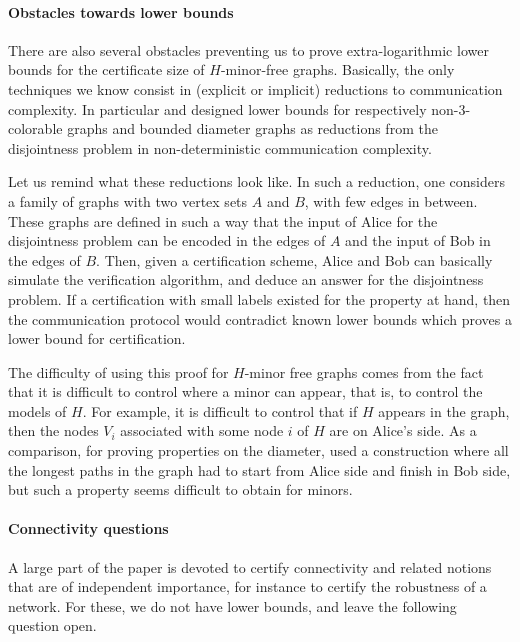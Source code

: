 \documentclass[a4paper,thm-restate,USenglish]{lipics-v2019}
\begin{document}
\paragraph*{Obstacles towards lower bounds}

There are also several obstacles preventing us to prove extra-logarithmic lower bounds for the certificate size of $H$-minor-free graphs. 
Basically, the only techniques we know consist in (explicit or implicit) reductions to communication complexity. 
In particular \cite{GoosS16} and \cite{Censor-HillelPP20} designed lower bounds for respectively non-3-colorable graphs and bounded diameter graphs as reductions from the disjointness problem in non-deterministic communication complexity. 

Let us remind what these reductions look like.
In such a reduction, one considers a family of graphs with two vertex sets $A$ and $B$, with few edges in between. 
These graphs are defined in such a way that the input of Alice for the disjointness problem can be encoded in the edges of $A$ and the input of Bob in the edges of $B$.
Then, given a certification scheme, Alice and Bob can basically simulate the verification algorithm, and deduce an answer for the disjointness problem. 
If a certification with small labels existed for the property at hand, then the communication protocol would contradict known lower bounds which proves a lower bound for certification.

The difficulty of using this proof for $H$-minor free graphs comes from the fact that it is difficult to control where a minor can appear, that is, to control the models of $H$.
For example, it is difficult to control that if $H$ appears in the graph, then the nodes $V_i$ associated with some node $i$ of $H$ are on Alice's side.
As a comparison, for proving properties on the diameter, \cite{Censor-HillelPP20} used a construction where all the longest paths in the graph had to start from Alice side and finish in Bob side, but such a property seems difficult to obtain for minors. 

\paragraph*{Connectivity questions}

A large part of the paper is devoted to certify connectivity and related notions that are of independent importance, for instance to certify the robustness of a network.
For these, we do not have lower bounds, and leave the following question open.
\end{document}
